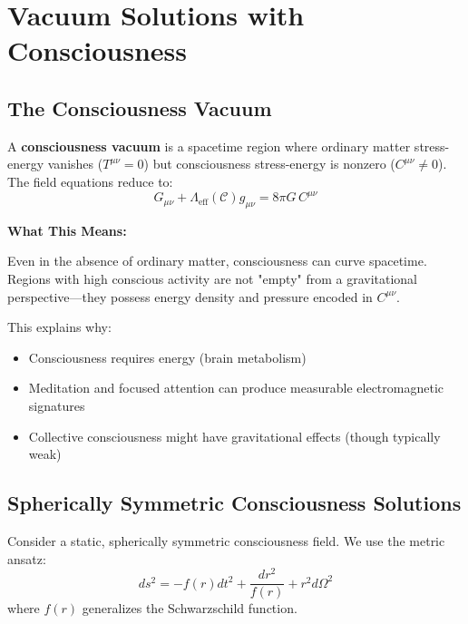 \section{Vacuum Solutions with Consciousness}

\subsection{The Consciousness Vacuum}

\begin{definition}\label{def:consciousness-vacuum}
A \textbf{consciousness vacuum} is a spacetime region where ordinary matter stress-energy vanishes ($T^{\mu\nu} = 0$) but consciousness stress-energy is nonzero ($C^{\mu\nu} \neq 0$). The field equations reduce to:
\begin{equation}
G_{\mu\nu} + \Lambda_{\text{eff}}(\mathcal{C}) g_{\mu\nu} = 8\pi G \, C^{\mu\nu}
\end{equation}
\end{definition}

\begin{level1}
\textbf{What This Means:}

Even in the absence of ordinary matter, consciousness can curve spacetime. Regions with high conscious activity are not "empty" from a gravitational perspective---they possess energy density and pressure encoded in $C^{\mu\nu}$.

This explains why:
\begin{itemize}
\item Consciousness requires energy (brain metabolism)
\item Meditation and focused attention can produce measurable electromagnetic signatures
\item Collective consciousness might have gravitational effects (though typically weak)
\end{itemize}
\end{level1}

\subsection{Spherically Symmetric Consciousness Solutions}

Consider a static, spherically symmetric consciousness field. We use the metric ansatz:
\begin{equation}
ds^2 = -f(r) dt^2 + \frac{dr^2}{f(r)} + r^2 d\Omega^2
\end{equation}
where $f(r)$ generalizes the Schwarzschild function.

